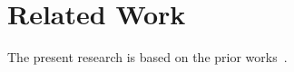 \section{Related Work}
\label{sec:related}

The present research is based on the prior works~\cite{xia2016object}.
